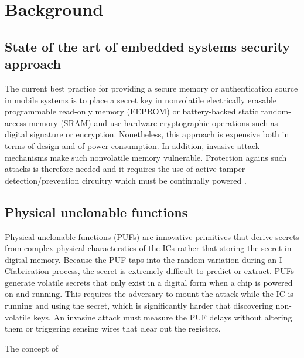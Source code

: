 \chapter{Background}

\section{State of the art of embedded systems security approach}

The current best practice for providing a secure memory or authentication source in mobile systems is to place a secret key in nonvolatile electrically erasable programmable read-only memory (EEPROM) or battery-backed static random-access memory (SRAM) and use hardware cryptographic operations such as digital signature or encryption. Nonetheless, this approach is expensive both in terms of design and of power consumption. In addition, invasive attack mechanisms make such nonvolatile memory vulnerable. Protection agains such attacks is therefore needed and it requires the use of active tamper detection/prevention circuitry which must be continually powered \cite{PUF_IEEE_Herder}.

\section{Physical unclonable functions \cite{PUF_Sud_Devadas}}

Physical unclonable functions (PUFs) are innovative primitives that derive secrets from complex physical characterstics of the ICs rather that storing the secret in digital memory. Because the PUF taps into the random variation during an I Cfabrication process, the secret is extremely difficult to predict or extract. PUFs generate volatile secrets that only exist in a digital form when a chip is powered on and running. This requires the adversary to mount the attack while the IC is running and using the secret, which is significantly harder that discovering non-volatile keys. An invasine attack must measure the PUF delays without altering them or triggering sensing wires that clear out the registers. 

The concept of 